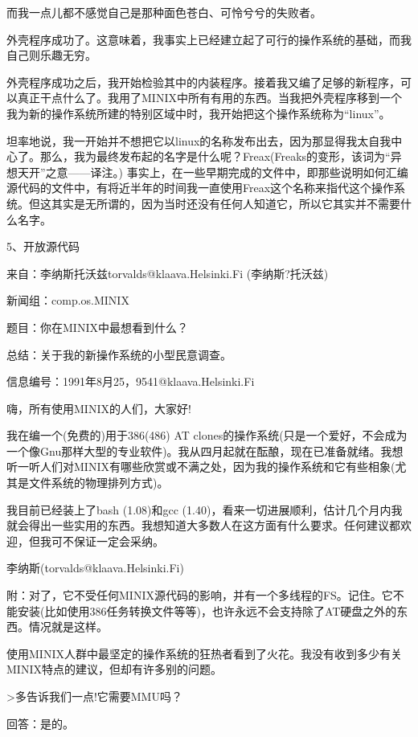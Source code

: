 而我一点儿都不感觉自己是那种面色苍白、可怜兮兮的失败者。

外壳程序成功了。这意味着，我事实上已经建立起了可行的操作系统的基础，而我自己则乐趣无穷。

外壳程序成功之后，我开始检验其中的内装程序。接着我又编了足够的新程序，可以真正干点什么了。我用了MINIX中所有有用的东西。当我把外壳程序移到一个我为新的操作系统所建的特别区域中时，我开始把这个操作系统称为“linux”。

坦率地说，我一开始并不想把它以linux的名称发布出去，因为那显得我太自我中心了。那么，我为最终发布起的名字是什么呢？Freax(Freaks的变形，该词为“异想天开”之意——译注。) 事实上，在一些早期完成的文件中，即那些说明如何汇编源代码的文件中，有将近半年的时间我一直使用Freax这个名称来指代这个操作系统。但这其实是无所谓的，因为当时还没有任何人知道它，所以它其实并不需要什么名字。

 
5、开放源代码

来自：李纳斯托沃兹torvalds@klaava.Helsinki.Fi (李纳斯?托沃兹)

新闻组：comp.os.MINIX

题目：你在MINIX中最想看到什么？

总结：关于我的新操作系统的小型民意调查。

信息编号：1991年8月25，9541@klaava.Helsinki.Fi

 

嗨，所有使用MINIX的人们，大家好!

我在编一个(免费的)用于386(486) AT clones的操作系统(只是一个爱好，不会成为一个像Gnu那样大型的专业软件)。我从四月起就在酝酿，现在已准备就绪。我想听一听人们对MINIX有哪些欣赏或不满之处，因为我的操作系统和它有些相象(尤其是文件系统的物理排列方式)。

我目前已经装上了bash (1.08)和gcc (1.40)，看来一切进展顺利，估计几个月内我就会得出一些实用的东西。我想知道大多数人在这方面有什么要求。任何建议都欢迎，但我可不保证一定会采纳。

李纳斯(torvalds@klaava.Helsinki.Fi)

附：对了，它不受任何MINIX源代码的影响，并有一个多线程的FS。记住。它不能安装(比如使用386任务转换文件等等)，也许永远不会支持除了AT硬盘之外的东西。情况就是这样。

 

使用MINIX人群中最坚定的操作系统的狂热者看到了火花。我没有收到多少有关MINIX特点的建议，但却有许多别的问题。

 

>多告诉我们一点!它需要MMU吗？

回答：是的。

